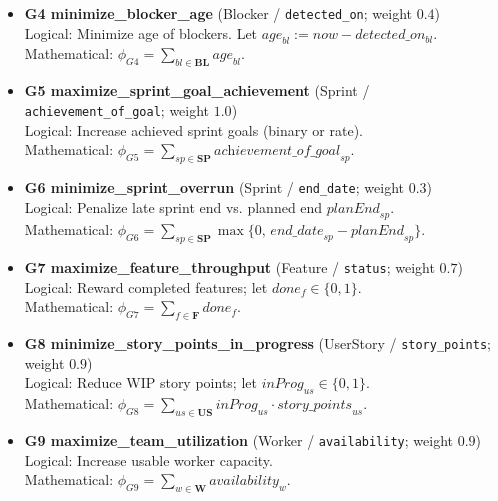 \documentclass[11pt,a4paper]{article}
\begin{document}
\begin{itemize}[leftmargin=2em,itemsep=0.5em]
  \item \textbf{G4 minimize\_blocker\_age} (Blocker / \texttt{detected\_on}; weight $0.4$)\\
  Logical: Minimize age of blockers. Let $\textit{age}_{bl} := \textit{now}-\textit{detected\_on}_{bl}$.\\
  Mathematical: $\displaystyle \phi_{G4} = \sum_{bl \in \mathbf{BL}} \textit{age}_{bl}$.

  \item \textbf{G5 maximize\_sprint\_goal\_achievement} (Sprint / \texttt{achievement\_of\_goal}; weight $1.0$)\\
  Logical: Increase achieved sprint goals (binary or rate).\\
  Mathematical: $\displaystyle \phi_{G5} = \sum_{sp \in \mathbf{SP}} \textit{achievement\_of\_goal}_{sp}$.

  \item \textbf{G6 minimize\_sprint\_overrun} (Sprint / \texttt{end\_date}; weight $0.3$)\\
  Logical: Penalize late sprint end vs. planned end $\textit{planEnd}_{sp}$.\\
  Mathematical: $\displaystyle \phi_{G6} = \sum_{sp \in \mathbf{SP}} \max\{0,\, \textit{end\_date}_{sp}-\textit{planEnd}_{sp}\}$.

  \item \textbf{G7 maximize\_feature\_throughput} (Feature / \texttt{status}; weight $0.7$)\\
  Logical: Reward completed features; let $\textit{done}_{f}\in\{0,1\}$.\\
  Mathematical: $\displaystyle \phi_{G7} = \sum_{f \in \mathbf{F}} \textit{done}_{f}$.

  \item \textbf{G8 minimize\_story\_points\_in\_progress} (UserStory / \texttt{story\_points}; weight $0.9$)\\
  Logical: Reduce WIP story points; let $\textit{inProg}_{us}\in\{0,1\}$.\\
  Mathematical: $\displaystyle \phi_{G8} = \sum_{us \in \mathbf{US}} \textit{inProg}_{us}\cdot \textit{story\_points}_{us}$.

  \item \textbf{G9 maximize\_team\_utilization} (Worker / \texttt{availability}; weight $0.9$)\\
  Logical: Increase usable worker capacity.\\
  Mathematical: $\displaystyle \phi_{G9} = \sum_{w \in \mathbf{W}} \textit{availability}_{w}$.


\end{itemize}
\end{document}

